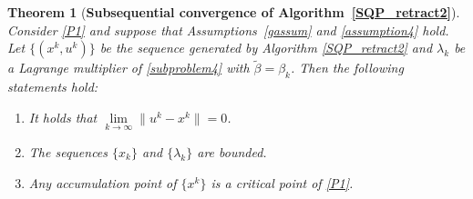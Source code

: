 \documentclass[10pt]{article}
\numberwithin{equation}{section}
\newtheorem{theorem}{Theorem}[section]
\begin{document}
\begin{theorem}[{{\bf Subsequential convergence of Algorithm~\ref{SQP_retract2}}}]\label{convergence3}
Consider \eqref{P1} and suppose that Assumptions~\ref{gassum} and \ref{assumption4} hold. Let {\color{black}$\{(x^k,u^k)\}$} be the sequence generated by Algorithm \ref{SQP_retract2} and $\lambda_k$ be a Lagrange multiplier of \eqref{subproblem4} with $\widetilde{\beta} = \beta_k$.  Then the following statements hold:
\begin{enumerate}[{\rm(i)}]
  \item It holds that $\lim\limits_{k\rightarrow\infty}\|u^k - x^k\| = 0$.
  \item The sequences $\{x_k\}$ and $\{\lambda_k\}$ are bounded.
  \item Any accumulation point of $\{x^k\}$ is a {\color{black}critical point} of \eqref{P1}.
\end{enumerate}
\end{theorem}
%
\end{document}
